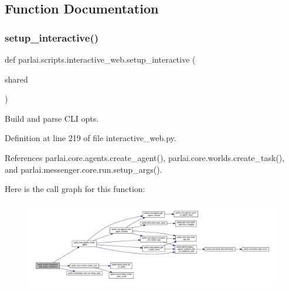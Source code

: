 \subsection{Function Documentation}
\mbox{\label{namespaceparlai_1_1scripts_1_1interactive__web_abeab09cab4f9e60077ffd5050bff36ef}} 
\subsubsection{\texorpdfstring{setup\+\_\+interactive()}{setup\_interactive()}}
{\footnotesize\ttfamily def parlai.\+scripts.\+interactive\+\_\+web.\+setup\+\_\+interactive (\begin{DoxyParamCaption}\item[{}]{shared }\end{DoxyParamCaption})}

\begin{DoxyVerb}Build and parse CLI opts.\end{DoxyVerb}
 

Definition at line 219 of file interactive\+\_\+web.\+py.



References parlai.\+core.\+agents.\+create\+\_\+agent(), parlai.\+core.\+worlds.\+create\+\_\+task(), and parlai.\+messenger.\+core.\+run.\+setup\+\_\+args().

Here is the call graph for this function\+:
\nopagebreak
\begin{figure}[H]
\begin{center}
\leavevmode
\includegraphics[width=350pt]{namespaceparlai_1_1scripts_1_1interactive__web_abeab09cab4f9e60077ffd5050bff36ef_cgraph}
\end{center}
\end{figure}



